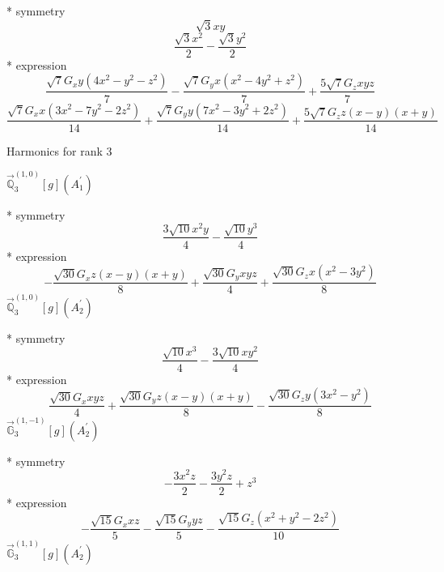 \documentclass[fleqn,8pt]{jsarticle}
\begin{document}
\noindent\quad ** symmetry
\begin{dmath*}
\sqrt{3} x y
\end{dmath*}
\begin{dmath*}
\frac{\sqrt{3} x^{2}}{2} - \frac{\sqrt{3} y^{2}}{2}
\end{dmath*}
\noindent\quad ** expression
\begin{dmath*}
\frac{\sqrt{7} G_{x} y \left(4 x^{2} - y^{2} - z^{2}\right)}{7} - \frac{\sqrt{7} G_{y} x \left(x^{2} - 4 y^{2} + z^{2}\right)}{7} + \frac{5 \sqrt{7} G_{z} x y z}{7}
\end{dmath*}
\begin{dmath*}
\frac{\sqrt{7} G_{x} x \left(3 x^{2} - 7 y^{2} - 2 z^{2}\right)}{14} + \frac{\sqrt{7} G_{y} y \left(7 x^{2} - 3 y^{2} + 2 z^{2}\right)}{14} + \frac{5 \sqrt{7} G_{z} z \left(x - y\right) \left(x + y\right)}{14}
\end{dmath*}

\noindent * Harmonics for rank 3

\noindent\quad $\vec{\mathbb{Q}}_{3}^{(1,0)}[g](A_{1}^{\prime})$

\noindent\quad ** symmetry
\begin{dmath*}
\frac{3 \sqrt{10} x^{2} y}{4} - \frac{\sqrt{10} y^{3}}{4}
\end{dmath*}
\noindent\quad ** expression
\begin{dmath*}
- \frac{\sqrt{30} G_{x} z \left(x - y\right) \left(x + y\right)}{8} + \frac{\sqrt{30} G_{y} x y z}{4} + \frac{\sqrt{30} G_{z} x \left(x^{2} - 3 y^{2}\right)}{8}
\end{dmath*}
\noindent\quad $\vec{\mathbb{Q}}_{3}^{(1,0)}[g](A_{2}^{\prime})$

\noindent\quad ** symmetry
\begin{dmath*}
\frac{\sqrt{10} x^{3}}{4} - \frac{3 \sqrt{10} x y^{2}}{4}
\end{dmath*}
\noindent\quad ** expression
\begin{dmath*}
\frac{\sqrt{30} G_{x} x y z}{4} + \frac{\sqrt{30} G_{y} z \left(x - y\right) \left(x + y\right)}{8} - \frac{\sqrt{30} G_{z} y \left(3 x^{2} - y^{2}\right)}{8}
\end{dmath*}
\noindent\quad $\vec{\mathbb{G}}_{3}^{(1,-1)}[g](A_{2}^{\prime})$

\noindent\quad ** symmetry
\begin{dmath*}
- \frac{3 x^{2} z}{2} - \frac{3 y^{2} z}{2} + z^{3}
\end{dmath*}
\noindent\quad ** expression
\begin{dmath*}
- \frac{\sqrt{15} G_{x} x z}{5} - \frac{\sqrt{15} G_{y} y z}{5} - \frac{\sqrt{15} G_{z} \left(x^{2} + y^{2} - 2 z^{2}\right)}{10}
\end{dmath*}
\noindent\quad $\vec{\mathbb{G}}_{3}^{(1,1)}[g](A_{2}^{\prime})$
\end{document}
